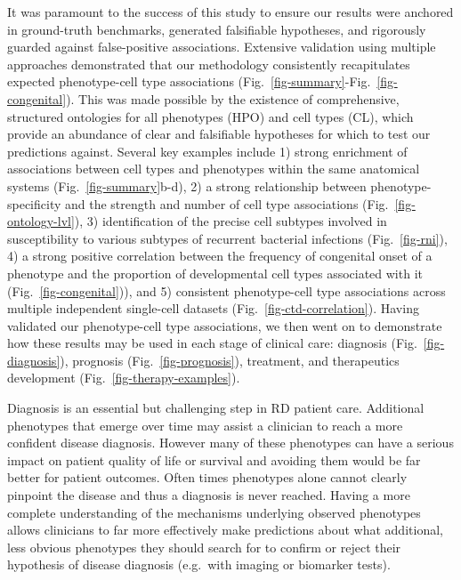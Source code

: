 \documentclass[
sn-nature
]{sn-jnl}
\begin{document}
It was paramount to the success of this study to ensure our results were
anchored in ground-truth benchmarks, generated falsifiable hypotheses,
and rigorously guarded against false-positive associations. Extensive
validation using multiple approaches demonstrated that our methodology
consistently recapitulates expected phenotype-cell type associations
(Fig.~\ref{fig-summary}-Fig.~\ref{fig-congenital}). This was made
possible by the existence of comprehensive, structured ontologies for
all phenotypes (HPO) and cell types (CL), which provide an abundance of
clear and falsifiable hypotheses for which to test our predictions
against. Several key examples include 1) strong enrichment of
associations between cell types and phenotypes within the same
anatomical systems (Fig.~\ref{fig-summary}b-d), 2) a strong relationship
between phenotype-specificity and the strength and number of cell type
associations (Fig.~\ref{fig-ontology-lvl}), 3) identification of the
precise cell subtypes involved in susceptibility to various subtypes of
recurrent bacterial infections (Fig.~\ref{fig-rni}), 4) a strong
positive correlation between the frequency of congenital onset of a
phenotype and the proportion of developmental cell types associated with
it (Fig.~\ref{fig-congenital})), and 5) consistent phenotype-cell type
associations across multiple independent single-cell datasets
(Fig.~\ref{fig-ctd-correlation}). Having validated our phenotype-cell
type associations, we then went on to demonstrate how these results may
be used in each stage of clinical care: diagnosis
(Fig.~\ref{fig-diagnosis}), prognosis (Fig.~\ref{fig-prognosis}),
treatment, and therapeutics development
(Fig.~\ref{fig-therapy-examples}).

Diagnosis is an essential but challenging step in RD patient care.
Additional phenotypes that emerge over time may assist a clinician to
reach a more confident disease diagnosis. However many of these
phenotypes can have a serious impact on patient quality of life or
survival and avoiding them would be far better for patient outcomes.
Often times phenotypes alone cannot clearly pinpoint the disease and
thus a diagnosis is never reached. Having a more complete understanding
of the mechanisms underlying observed phenotypes allows clinicians to
far more effectively make predictions about what additional, less
obvious phenotypes they should search for to confirm or reject their
hypothesis of disease diagnosis (e.g.~with imaging or biomarker tests).
\end{document}
